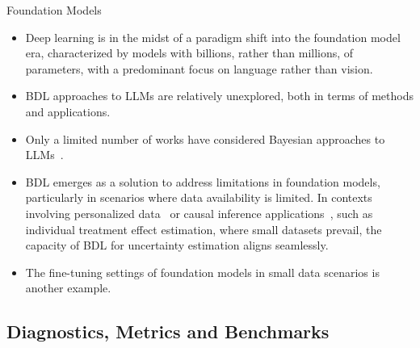\documentclass[9pt,handout]{beamer}
\begin{document}
\begin{frame}{Foundation Models}
\begin{itemize}[<+->]
	\item Deep learning is in the midst of a paradigm shift into the \alert{foundation model} era, characterized by models with \alert{billions, }rather than millions, of parameters, with a predominant focus on \alert{language} rather than vision. 
	\item BDL approaches to LLMs are relatively unexplored, both in terms of methods and applications. 
	\item Only a limited number of works have considered Bayesian approaches to LLMs~\citep{xie2021,cohen2022bayesian, margatina2022,yang2023bayesian}. %
	\item BDL emerges as a solution to address limitations in foundation models, particularly in scenarios where data availability is limited. In contexts involving \alert{personalized data}~\citep{moor2023foundation} or \alert{causal inference applications}~\citep{zhang2023towards}, such as individual treatment effect estimation, where small datasets prevail, the capacity of BDL for uncertainty estimation aligns seamlessly. 
	\item The \alert{fine-tuning settings} of foundation models in small data scenarios is another example. %
%
\end{itemize}
\end{frame}


\subsection{Diagnostics, Metrics and Benchmarks}
\end{document}
